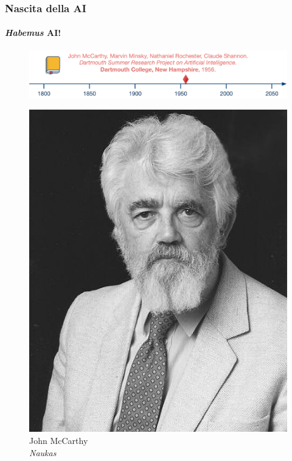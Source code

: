 \begin{frame}[t,fragile] \frametitle{Nascita della AI}
{\scriptsize
	\onslide<1->
		\framesubtitle{\textit{Habemus} AI!}
		\vspace*{-15pt}
		\begin{minipage}[t]{\textwidth}
			\begin{figure}[ht]
				\centering
				\includegraphics[width=\textwidth]{img/AI-timeline-1956-2-alt.png}
			\end{figure}
		\end{minipage}
	\begin{minipage}[t]{.4\textwidth}
		\vspace*{10pt}
		\begin{minipage}[t]{0.45\textwidth}
			\centering
			\begin{figure}[ht]
				\includegraphics[width=.73\textwidth]{img/John-McCarthy.jpg}
				{\tiny\\John McCarthy\\\vspace*{-1pt}\textit{\textcopyright Naukas}}
			\end{figure}
		\end{minipage}

\end{minipage}}
\end{frame}
